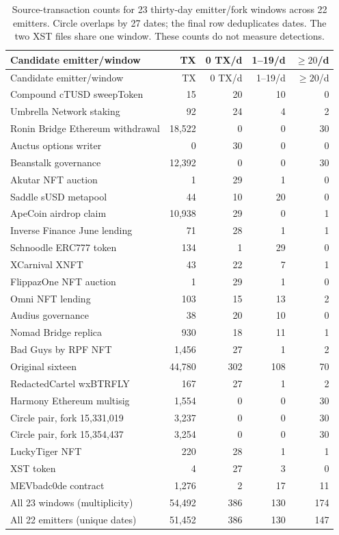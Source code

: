 \small
\setlength{\LTcapwidth}{\linewidth}
\begin{longtable}{@{}p{6.9cm}rrrr@{}}
\caption{Source-transaction counts for 23 thirty-day emitter/fork windows across 22 emitters. Circle overlaps by 27 dates; the final row deduplicates dates. The two XST files share one window. These counts do not measure detections.}\label{tab:allcensus}\\
\toprule
Candidate emitter/window & TX & 0 TX/d & 1--19/d & $\geq20$/d\\
\midrule
\endfirsthead
\toprule
Candidate emitter/window & TX & 0 TX/d & 1--19/d & $\geq20$/d\\
\midrule
\endhead
Compound cTUSD sweepToken & 15 & 20 & 10 & 0\\
Umbrella Network staking & 92 & 24 & 4 & 2\\
Ronin Bridge Ethereum withdrawal & 18,522 & 0 & 0 & 30\\
Auctus options writer & 0 & 30 & 0 & 0\\
Beanstalk governance & 12,392 & 0 & 0 & 30\\
Akutar NFT auction & 1 & 29 & 1 & 0\\
Saddle sUSD metapool & 44 & 10 & 20 & 0\\
ApeCoin airdrop claim & 10,938 & 29 & 0 & 1\\
Inverse Finance June lending & 71 & 28 & 1 & 1\\
Schnoodle ERC777 token & 134 & 1 & 29 & 0\\
XCarnival XNFT & 43 & 22 & 7 & 1\\
FlippazOne NFT auction & 1 & 29 & 1 & 0\\
Omni NFT lending & 103 & 15 & 13 & 2\\
Audius governance & 38 & 20 & 10 & 0\\
Nomad Bridge replica & 930 & 18 & 11 & 1\\
Bad Guys by RPF NFT & 1,456 & 27 & 1 & 2\\
\midrule
Original sixteen & 44,780 & 302 & 108 & 70\\
\midrule
RedactedCartel wxBTRFLY & 167 & 27 & 1 & 2\\
Harmony Ethereum multisig & 1,554 & 0 & 0 & 30\\
Circle pair, fork 15,331,019 & 3,237 & 0 & 0 & 30\\
Circle pair, fork 15,354,437 & 3,254 & 0 & 0 & 30\\
LuckyTiger NFT & 220 & 28 & 1 & 1\\
XST token & 4 & 27 & 3 & 0\\
MEVbadc0de contract & 1,276 & 2 & 17 & 11\\
\midrule
All 23 windows (multiplicity) & 54,492 & 386 & 130 & 174\\
All 22 emitters (unique dates) & 51,452 & 386 & 130 & 147\\
\bottomrule
\end{longtable}
\normalsize

